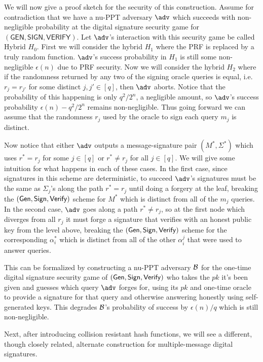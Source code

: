We will now give a proof sketch for the security of this construction. 
Assume for contradiction that we have a nu-PPT adversary $\adv$ which succeeds with non-negligible probability at the digital signature security game for $(\mathsf{GEN}, \mathsf{SIGN}, \mathsf{VERIFY})$. 
Let $\adv$'s interaction with this security game be called Hybrid $H_0$. 
First we will consider the hybrid $H_1$ where the PRF is replaced by a truly random function. 
$\adv$'s success probability in $H_1$ is still some non-negligible $\epsilon(n)$ due to PRF security. 
Now we will consider the hybrid $H_2$ where if the randomness returned by any two of the signing oracle queries is equal, i.e. $r_j = r_{j'}$ for some distinct $j, j' \in [q]$, then $\adv$ aborts. 
Notice that the probability of this happening is only $q^2/2^n$, a negligible amount, so $\adv$'s success probability $\epsilon(n) - q^2/2^n$ remains non-negligible. 
Thus going forward we can assume that the randomness $r_j$ used by the oracle to sign each query $m_j$ is distinct. 

Now notice that either $\adv$ outputs a message-signature pair $(M^*, \Sigma^*)$ which uses $r^* = r_j$ for some $j \in [q]$ or $r^* \not = r_j$ for all $j \in [q]$. 
We will give some intuition for what happens in each of these cases. 
In the first case, since signatures in this scheme are deterministic, to succeed $\adv$'s signatures must be the same as $\Sigma_j$'s along the path $r^* = r_j$ until doing a forgery at the leaf, breaking the $(\mathsf{Gen}, \mathsf{Sign}, \mathsf{Verify})$ scheme for $M^*$ which is distinct from all of the $m_j$ queries. 
In the second case, $\adv$ goes along a path $r^* \not = r_j$, so at the first node which diverges from all $r_j$ it must forge a signature that verifies with an honest public key from the level above, breaking the $(\mathsf{Gen}, \mathsf{Sign}, \mathsf{Verify})$ scheme for the corresponding $\alpha_i^*$ which is distinct from all of the other $\alpha_i^j$ that were used to answer queries. 

This can be formalized by constructing a nu-PPT adversary $\mathcal{B}$ for the one-time digital signature security game of $(\mathsf{Gen}, \mathsf{Sign}, \mathsf{Verify})$ who takes the $pk$ it's been given and guesses which query $\adv$ forges for, using its $pk$ and one-time oracle to provide a signature for that query and otherwise answering honestly using self-generated keys. 
This degrades $\mathcal{B}$'s probability of success by $\epsilon(n)/q$ which is still non-negligible. 

Next, after introducing collision resistant hash functions, we will see a different, though closely related, alternate construction for multiple-message digital signatures. 


